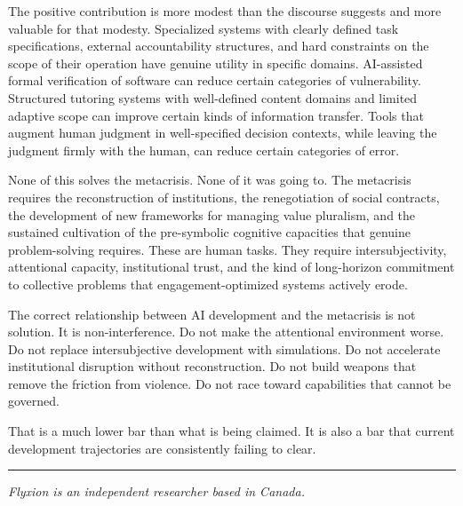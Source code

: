\documentclass[12pt, a4paper]{article}
\theoremstyle{remark}
\begin{document}
The positive contribution is more modest than the discourse suggests and more valuable for that modesty. Specialized systems with clearly defined task specifications, external accountability structures, and hard constraints on the scope of their operation have genuine utility in specific domains. AI-assisted formal verification of software can reduce certain categories of vulnerability. Structured tutoring systems with well-defined content domains and limited adaptive scope can improve certain kinds of information transfer. Tools that augment human judgment in well-specified decision contexts, while leaving the judgment firmly with the human, can reduce certain categories of error.

None of this solves the metacrisis. None of it was going to. The metacrisis requires the reconstruction of institutions, the renegotiation of social contracts, the development of new frameworks for managing value pluralism, and the sustained cultivation of the pre-symbolic cognitive capacities that genuine problem-solving requires. These are human tasks. They require intersubjectivity, attentional capacity, institutional trust, and the kind of long-horizon commitment to collective problems that engagement-optimized systems actively erode.

The correct relationship between AI development and the metacrisis is not solution. It is non-interference. Do not make the attentional environment worse. Do not replace intersubjective development with simulations. Do not accelerate institutional disruption without reconstruction. Do not build weapons that remove the friction from violence. Do not race toward capabilities that cannot be governed.

That is a much lower bar than what is being claimed. It is also a bar that current development trajectories are consistently failing to clear.

\bigskip

\noindent\rule{\textwidth}{0.4pt}

\bigskip

\noindent\textit{Flyxion is an independent researcher based in Canada.}
\end{document}
